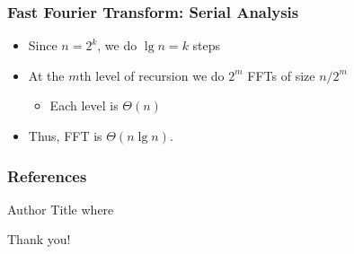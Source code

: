 \documentclass[xcolor=pdftex,dvipsnames,table]{presentation}
\begin{document}
\begin{frame}
	\frametitle{Fast Fourier Transform: Serial Analysis}

	\begin{itemize}
		\item Since $n=2^k$, we do $\lg n=k$ steps
		\item At the $m$th level of recursion we do $2^m$ FFTs of size $n/2^m$
		\begin{itemize}
			\item Each level is $\Theta(n)$
		\end{itemize}
		\item Thus, FFT is $\Theta(n\lg n)$.
	\end{itemize}
\end{frame}

\begin{frame}[allowframebreaks]
\frametitle{References}
	\begin{thebibliography}{10}
		Author
		\newblock{} Title
		\newblock{} where
	\end{thebibliography}
\end{frame}

\begin{frame}
\begin{Large}
\begin{center}
Thank you!
\end{center}
\end{Large}
\end{frame}
\end{document}
